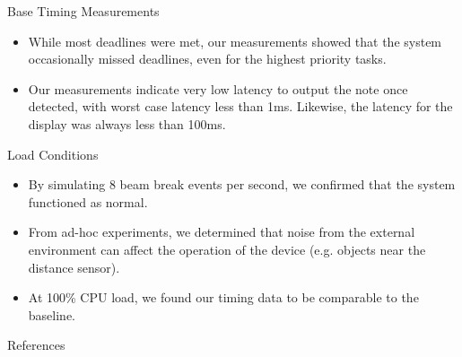 \documentclass[
11pt,notheorems,hyperref={pdfauthor=whatever}
]{beamer}
\begin{document}
\begin{frame}

\begin{block}{Base Timing Measurements}
\begin{itemize}
    \item While most deadlines were met, our measurements
    showed that the system occasionally missed deadlines,
    even for the highest priority tasks.
    \item Our measurements indicate very low latency
    to output the note once detected, with worst case
    latency less than 1ms. Likewise, the latency for
    the display was always less than 100ms.
\end{itemize}
\end{block}

\begin{block}{Load Conditions}
\begin{itemize}
    \item By simulating 8 beam break events per second,
    we confirmed that the system functioned as normal.
    \item From ad-hoc experiments, we determined that
    noise from the external environment can
    affect the operation of the device (e.g. objects
    near the distance sensor).
    \item At 100\% CPU load, we found our timing data
        to be comparable to the baseline.
\end{itemize}
\end{block}

\end{frame}

\begin{frame}[allowframebreaks]{References}
    \printbibliography
\end{frame}
\end{document}
